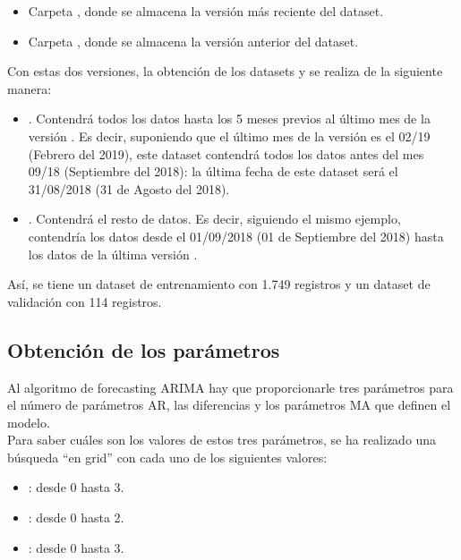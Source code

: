 \begin{itemize}
 \item Carpeta  \citep{master}, donde se almacena la versión más reciente del dataset.
 \item Carpeta  \citep{master}, donde se almacena la versión anterior del dataset.
\end{itemize}

Con estas dos versiones, la obtención de los datasets  y  se realiza de la siguiente manera: 

\begin{itemize}
 \item {}. Contendrá todos los datos hasta los 5 meses previos al último mes de la versión . Es decir, suponiendo que el último mes de la versión  es el 02/19 (Febrero del 2019), este dataset contendrá todos los datos antes del mes 09/18 (Septiembre del 2018): la última fecha de este dataset será el 31/08/2018 (31 de Agosto del 2018).
 \item {}. Contendrá el resto de datos. Es decir, siguiendo el mismo ejemplo, contendría los datos desde el 01/09/2018 (01 de Septiembre del 2018) hasta los datos de la última versión .
\end{itemize}

Así, se tiene un dataset de entrenamiento  con 1.749 registros y un dataset de validación  con 114 registros.





\subsection{Obtención de los parámetros }

Al algoritmo de forecasting ARIMA \citep{arima} hay que proporcionarle tres parámetros  para el número de parámetros AR, las diferencias y los parámetros MA que definen el modelo. \\

Para saber cuáles son los valores de estos tres parámetros, se ha realizado una búsqueda ``en grid'' con cada uno de los siguientes valores:

\begin{itemize}
 \item {}: desde 0 hasta 3.
 \item {}: desde 0 hasta 2.
 \item {}: desde 0 hasta 3.
\end{itemize}

